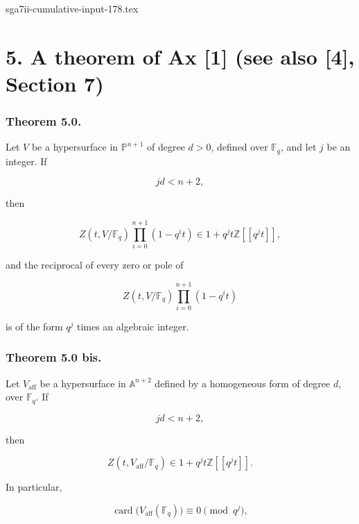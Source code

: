 \begin{filecontents*}{sga7ii-cumulative-input-178.tex}
\section*{5. A theorem of Ax [1] (see also [4], Section 7)}

\subsubsection*{Theorem 5.0.}
Let $V$ be a hypersurface in $\mathbb P^{n+1}$ of degree $d>0$, defined
over $\mathbb F_q$, and let $j$ be an integer.  If

\begin{equation}\tag{5.0.1}
jd<n+2,
\end{equation}

then

\begin{equation}\tag{5.0.2}
Z(t,V/\mathbb F_q)\prod_{i=0}^{n+1}(1-q^it)
\in1+q^jt\mathbb Z[[q^jt]],
\end{equation}

and the reciprocal of every zero or pole of

\begin{equation}\tag{5.0.3}
Z(t,V/\mathbb F_q)\prod_{i=0}^{n+1}(1-q^it)
\end{equation}

\noindent
is of the form $q^j$ times an algebraic integer.

\subsubsection*{Theorem 5.0 bis.}
Let $V_{\mathrm{aff}}$ be a hypersurface in $\mathbb A^{n+2}$ defined by a
homogeneous form of degree $d$, over $\mathbb F_q$.  If

\begin{equation}\tag{5.0.4}
jd<n+2,
\end{equation}

then

\begin{equation}\tag{5.0.5}
Z(t,V_{\mathrm{aff}}/\mathbb F_q)
\in1+q^jt\mathbb Z[[q^jt]].
\end{equation}

In particular,

\begin{equation}\tag{5.0.6}
\operatorname{card}\bigl(V_{\mathrm{aff}}(\mathbb F_q)\bigr)
\equiv0\pmod{q^j},
\end{equation}


\end{filecontents*}
